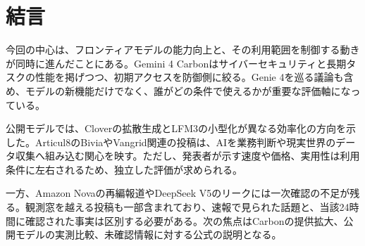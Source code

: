 \section*{結言}
今回の中心は、フロンティアモデルの能力向上と、その利用範囲を制御する動きが同時に進んだことにある。Gemini 4 Carbonはサイバーセキュリティと長期タスクの性能を掲げつつ、初期アクセスを防御側に絞る。Genie 4を巡る議論も含め、モデルの新機能だけでなく、誰がどの条件で使えるかが重要な評価軸になっている。

公開モデルでは、Cloverの拡散生成とLFM3の小型化が異なる効率化の方向を示した。Articul8のBiviaやVangrid関連の投稿は、AIを業務判断や現実世界のデータ収集へ組み込む関心を映す。ただし、発表者が示す速度や価格、実用性は利用条件に左右されるため、独立した評価が求められる。

一方、Amazon Novaの再編報道やDeepSeek V5のリークには一次確認の不足が残る。観測窓を越える投稿も一部含まれており、速報で見られた話題と、当該24時間に確認された事実は区別する必要がある。次の焦点はCarbonの提供拡大、公開モデルの実測比較、未確認情報に対する公式の説明となる。
